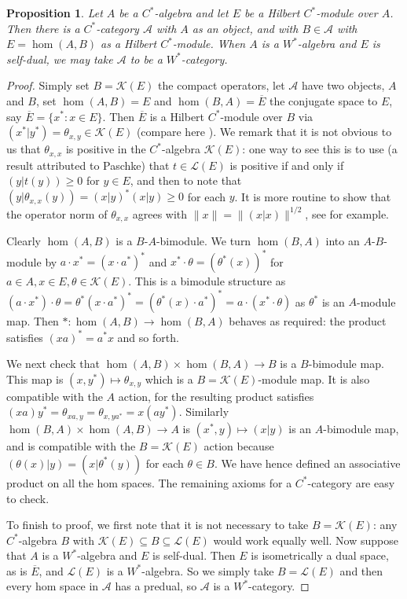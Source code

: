 \documentclass[a4paper,11pt]{article}
\theoremstyle{plain}
\newtheorem{proposition}{Proposition}[section]
\theoremstyle{remark}
\newcommand{\mc}[1]{\mathcal{#1}}
\begin{document}
\begin{proposition}\label{prop:mod_is_hom_space}
Let $A$ be a $C^*$-algebra and let $E$ be a Hilbert $C^*$-module over $A$.  Then there is a $C^*$-category $\mc A$ with $A$ as an object, and with $B\in\mc A$ with $E = \hom(A,B)$ as a Hilbert $C^*$-module.  When $A$ is a $W^*$-algebra and $E$ is self-dual, we may take $\mc A$ to be a $W^*$-category.
\end{proposition}
\begin{proof}
Simply set $B = \mc K(E)$ the compact operators, let $\mc A$ have two objects, $A$ and $B$, set $\hom(A,B) = E$ and $\hom(B,A) = \overline{E}$ the conjugate space to $E$, say $\overline E = \{ x^* : x\in E \}$.  Then $\overline E$ is a Hilbert $C^*$-module over $B$ via $(x^*|y^*) = \theta_{x,y} \in \mc K(E)$ (compare here \cite[Example~2.11]{RaeburnWilliams_MoritaEquivBook}).  We remark that it is not obvious to us that $\theta_{x,x}$ is positive in the $C^*$-algebra $\mc K(E)$: one way to see this is to use \cite[Lemma~4.1]{Lance_HilbModsBook} (a result attributed to Paschke) that $t\in\mc L(E)$ is positive if and only if $(y|t(y)) \geq 0$ for $y\in E$, and then to note that $(y|\theta_{x,x}(y)) = (x|y)^*(x|y) \geq 0$ for each $y$.  It is more routine to show that the operator norm of $\theta_{x,x}$ agrees with $\|x\| = \|(x|x)\|^{1/2}$, see \cite[Proposition~1.7(ii)]{BMS_quasimults} for example.

Clearly $\hom(A,B)$ is a $B$-$A$-bimodule.  We turn $\hom(B,A)$ into an $A$-$B$-module by $a\cdot x^* = (x\cdot a^*)^*$ and $x^* \cdot \theta = (\theta^*(x))^*$ for $a\in A, x\in E, \theta\in\mc K(E)$.  This is a bimodule structure as $(a\cdot x^*)\cdot \theta = \theta^*(x\cdot a^*)^* = (\theta^*(x)\cdot a^*)^* = a\cdot (x^*\cdot\theta)$ as $\theta^*$ is an $A$-module map.  Then $* \colon \hom(A,B) \to \hom(B,A)$ behaves as required: the product satisfies $(xa)^* = a^*x$ and so forth.

We next check that $\hom(A,B) \times \hom(B,A) \to B$ is a $B$-bimodule map.  This map is $(x,y^*) \mapsto \theta_{x,y}$ which is a $B=\mc K(E)$-module map.  It is also compatible with the $A$ action, for the resulting product satisfies $(xa)y^* = \theta_{xa,y} = \theta_{x,y a^*} = x(ay^*)$.  Similarly $\hom(B,A) \times \hom(A,B) \to A$ is $(x^*,y) \mapsto (x|y)$ is an $A$-bimodule map, and is compatible with the $B=\mc K(E)$ action because $(\theta(x)|y) = (x|\theta^*(y))$ for each $\theta\in B$.  We have hence defined an associative product on all the hom spaces.  The remaining axioms for a $C^*$-category are easy to check.

To finish to proof, we first note that it is not necessary to take $B = \mc K(E)$: any $C^*$-algebra $B$ with $\mc K(E) \subseteq B \subseteq \mc L(E)$ would work equally well.  Now suppose that $A$ is a $W^*$-algebra and $E$ is self-dual.  Then $E$ is isometrically a dual space, as is $\overline E$, and $\mc L(E)$ is a $W^*$-algebra.  So we simply take $B = \mc L(E)$ and then every hom space in $\mc A$ has a predual, so $\mc A$ is a $W^*$-category.
\end{proof}
\end{document}
